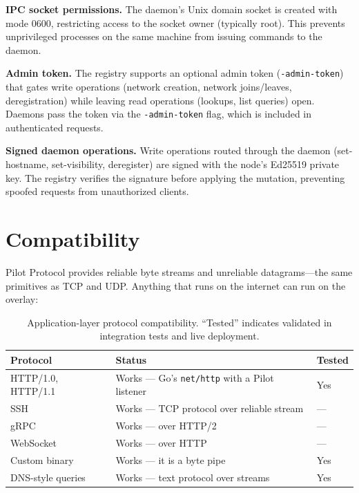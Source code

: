 \documentclass[11pt,a4paper]{article}
\begin{document}
\textbf{IPC socket permissions.} The daemon's Unix domain socket is created with mode 0600, restricting access to the socket owner (typically root). This prevents unprivileged processes on the same machine from issuing commands to the daemon.

\textbf{Admin token.} The registry supports an optional admin token (\texttt{-admin-token}) that gates write operations (network creation, network joins/leaves, deregistration) while leaving read operations (lookups, list queries) open. Daemons pass the token via the \texttt{-admin-token} flag, which is included in authenticated requests.

\textbf{Signed daemon operations.} Write operations routed through the daemon (set-hostname, set-visibility, deregister) are signed with the node's Ed25519 private key. The registry verifies the signature before applying the mutation, preventing spoofed requests from unauthorized clients.

\section{Compatibility}

Pilot Protocol provides reliable byte streams and unreliable datagrams---the same primitives as TCP and UDP. Anything that runs on the internet can run on the overlay:

\begin{table}[h]
\centering
\begin{tabular}{@{}lll@{}}
\toprule
\textbf{Protocol} & \textbf{Status} & \textbf{Tested} \\
\midrule
HTTP/1.0, HTTP/1.1 & Works --- Go's \texttt{net/http} with a Pilot listener & Yes \\
SSH                 & Works --- TCP protocol over reliable stream             & --- \\
gRPC                & Works --- over HTTP/2                                   & --- \\
WebSocket           & Works --- over HTTP                                     & --- \\
Custom binary       & Works --- it is a byte pipe                             & Yes \\
DNS-style queries   & Works --- text protocol over streams                    & Yes \\
\bottomrule
\end{tabular}
\caption{Application-layer protocol compatibility. ``Tested'' indicates validated in integration tests and live deployment.}
\label{tab:compat}
\end{table}
\end{document}
